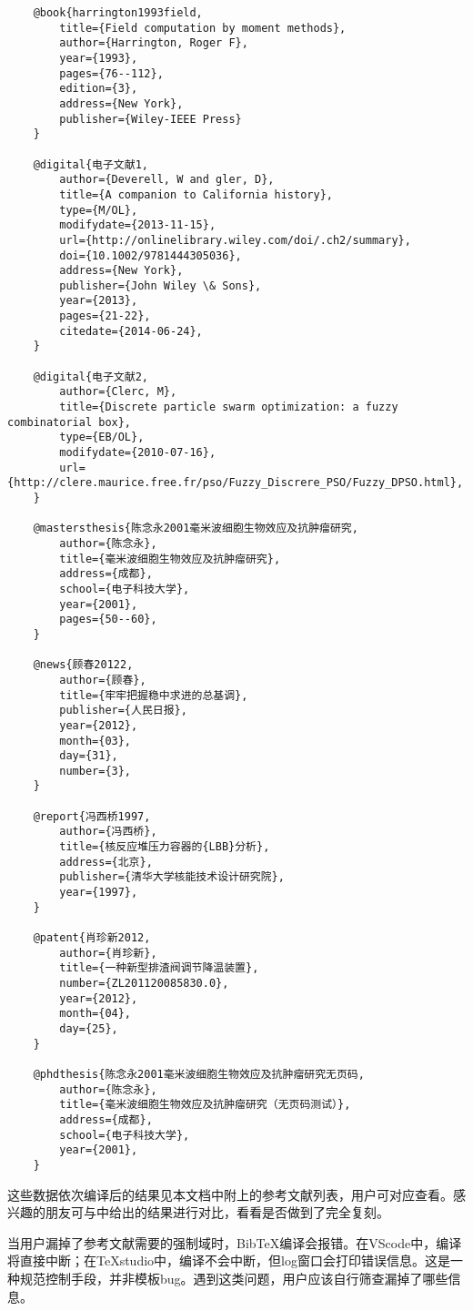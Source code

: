 \documentclass[print, doctor, vlined]{DissertUESTC}
\begin{document}
\begin{verbatim}
	@book{harrington1993field,
	    title={Field computation by moment methods},
	    author={Harrington, Roger F},
	    year={1993},
	    pages={76--112},
	    edition={3},
	    address={New York},
	    publisher={Wiley-IEEE Press}
	}
	
	@digital{电子文献1,
	    author={Deverell, W and gler, D},
	    title={A companion to California history},
	    type={M/OL},
	    modifydate={2013-11-15},
	    url={http://onlinelibrary.wiley.com/doi/.ch2/summary},
	    doi={10.1002/9781444305036},
	    address={New York},
	    publisher={John Wiley \& Sons},
	    year={2013},
	    pages={21-22},
	    citedate={2014-06-24},
	}
	
	@digital{电子文献2,
	    author={Clerc, M},
	    title={Discrete particle swarm optimization: a fuzzy combinatorial box},
	    type={EB/OL},
	    modifydate={2010-07-16},
	    url={http://clere.maurice.free.fr/pso/Fuzzy_Discrere_PSO/Fuzzy_DPSO.html},
	}
	
	@mastersthesis{陈念永2001毫米波细胞生物效应及抗肿瘤研究,
	    author={陈念永},
	    title={毫米波细胞生物效应及抗肿瘤研究},
	    address={成都},
	    school={电子科技大学},
	    year={2001},
	    pages={50--60},
	}
	
	@news{顾春20122,
	    author={顾春},
	    title={牢牢把握稳中求进的总基调},
	    publisher={人民日报},
	    year={2012},
	    month={03},
	    day={31},
	    number={3},
	}
	
	@report{冯西桥1997,
	    author={冯西桥},
	    title={核反应堆压力容器的{LBB}分析},
	    address={北京},
	    publisher={清华大学核能技术设计研究院},
	    year={1997},
	}
	
	@patent{肖珍新2012,
	    author={肖珍新},
	    title={一种新型排渣阀调节降温装置},
	    number={ZL201120085830.0},
	    year={2012},
	    month={04},
	    day={25},
	}

	@phdthesis{陈念永2001毫米波细胞生物效应及抗肿瘤研究无页码,
	    author={陈念永},
	    title={毫米波细胞生物效应及抗肿瘤研究（无页码测试）},
	    address={成都},
	    school={电子科技大学},
	    year={2001},
	}
	\end{verbatim}
	
	这些数据依次编译后的结果见本文档中附上的参考文献列表，用户可对应查看。感兴趣的朋友可与\href{https://gr.uestc.edu.cn/xiazai/114/3917}{}中给出的结果进行对比，看看是否做到了完全复刻。

	当用户漏掉了参考文献需要的强制域时，BibTeX编译会报错。在VScode中，编译将直接中断；在TeXstudio中，编译不会中断，但log窗口会打印错误信息。这是一种规范控制手段，并非模板bug。遇到这类问题，用户应该自行筛查漏掉了哪些信息。
	
\end{document}
